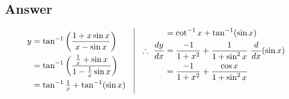 \documentclass[17pt]{extarticle}
\begin{document}
\begin{fleqn}
\subsection*{Answer}
\begin{equation} \nonumber
\begin{alignedat}{4}
y &=  \tan^{-1}\left(\frac{1 + x \sin x}{x - \sin x}\right)\\
  &=  \tan^{-1}\left(\frac{\frac{1}{x} + \sin x}{1 - \frac{1}{x}\sin x}\right)\\
  &=  \tan^{-1} \tfrac{1}{x} + \tan^{-1}(\sin x)  \\
\end{alignedat}
\quad
\vrule
\quad 
\begin{alignedat}{4}
&=  \cot^{-1}x + \tan^{-1}(\sin x)  \\
\therefore \  \frac{dy}{dx} &= \frac{-1}{1+x^2} + \frac{1}{1+\sin^2x}\ \frac{d}{dx}(\sin x)\\
&= \frac{-1}{1+x^2} + \frac{\cos x}{1+\sin^2x} \\
& \\
\end{alignedat}
\end{equation}


\end{fleqn}
\end{document}
